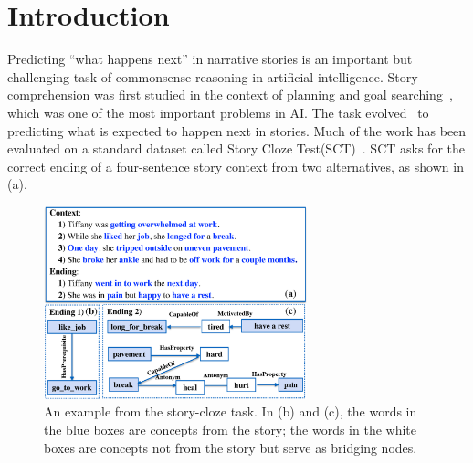 \section{Introduction}
\label{sec:intro}
Predicting ``what happens next'' in narrative stories is an important
but challenging task of commonsense reasoning in artificial intelligence. 
Story comprehension was first studied in the context of 
planning and goal searching~\cite{meehan1977tale}, which was one of the
most important problems in AI. The task evolved~\cite{chambers2008unsupervised}
to predicting what is expected to happen next in stories. Much of the work
has been evaluated on a standard dataset called 
Story Cloze Test(SCT)~\cite{mostafazadeh2016corpus}. 
SCT asks for the correct ending of a four-sentence
story context from two alternatives, as shown in
(a). 

\begin{figure}[th]
\centering\includegraphics[width=3in]{pictures/story_example}
\caption{An example from the story-cloze task. 
In (b) and (c), the words in the blue boxes are concepts from the story; 
the words in the white boxes are concepts not from the story 
but serve as bridging nodes. }
\label{fig:story}
\end{figure}

